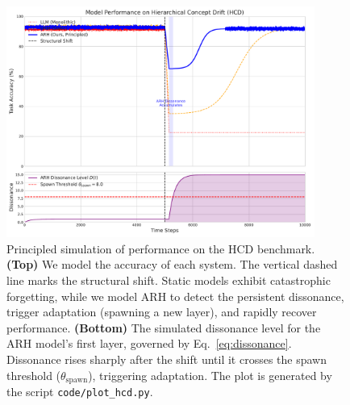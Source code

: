 \documentclass{article}
\begin{document}
\begin{figure}[h!]
    \centering
    \includegraphics[width=0.9\textwidth]{code/arh_hcd_visualization.pdf}
    \caption{Principled simulation of performance on the HCD benchmark. \textbf{(Top)} We model the accuracy of each system. The vertical dashed line marks the structural shift. Static models exhibit catastrophic forgetting, while we model ARH to detect the persistent dissonance, trigger adaptation (spawning a new layer), and rapidly recover performance. \textbf{(Bottom)} The simulated dissonance level for the ARH model's first layer, governed by Eq.~\ref{eq:dissonance}. Dissonance rises sharply after the shift until it crosses the spawn threshold ($\theta_{\text{spawn}}$), triggering adaptation. The plot is generated by the script \texttt{code/plot\_hcd.py}.}
    \label{fig:performance_plot}
\end{figure}

\begin{table}[h!]
\centering
\caption{Modeled performance on the HCD benchmark. The values for the baseline models are chosen for illustrative purposes, while the ARH recovery speed is derived from the dissonance simulation shown in Figure~\ref{fig:performance_plot}.}
\label{tab:results_hcd}
\end{table}
\end{document}
